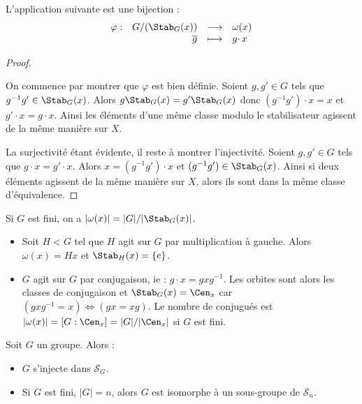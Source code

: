 \begin{prop}

 L'application suivante est une bijection :
\begin{displaymath}  \begin{array}{rrcl}
             \varphi :& G/(\Stab_G(x)) &\longrightarrow& \omega (x) \\
           &   \overline{g}   &\longmapsto    &g\cdotp x
             \end{array} \end{displaymath}
\end{prop}

\begin{proof}\ 

 On commence par montrer que $\varphi$ est bien définie.
Soient $g,g' \in G$ tels que $g^{-1}g' \in \Stab_G (x)$. Alors $g\Stab_G(x) =
g'\Stab_G(x)$ donc $(g^{-1}g')\cdotp x = x $ et $ g' \cdotp x = g
\cdotp x$. Ainsi les éléments d'une même classe modulo le stabilisateur
agissent de la même manière sur $X$.

La surjectivité étant évidente, il reste à montrer l'injectivité. Soient $g,g'
\in G$ tels que $g\cdotp x = g' \cdotp x$. Alors $x = (g^{-1}g')\cdotp x$ et
$(g^{-1}g') \in \Stab_G(x)$. Ainsi si deux éléments agissent de la même manière
sur $X$, alors ils sont dans la même classe d'équivalence.
\end{proof}

\begin{example}[Remarque]
 Si $G$ est fini, on a $|\omega(x)| = |G| / |\Stab_G(x)|$.
\end{example}

\begin{example}[Exemples]
\begin{itemize}
\item Soit $H < G$ tel que $H$ agit sur $G$ par multiplication à gauche. Alors
$\omega (x) = Hx$ et $\Stab_H(x) = \{e\}$.
 
\item $G$ agit sur $G$ par conjugaison, ie : $g\cdotp x = gxg^{-1}$. Les orbites
sont alors les classes de conjugaison et $\Stab_G(x) = \Cen_x$ car $(gxg^{-1} =
x) \Leftrightarrow (gx = xg)$. Le nombre de conjugués est $|\omega(x)| =
[G:\Cen_x] = |G| / |\Cen_x|$ si $G$ est fini.
\end{itemize} \end{example}

\begin{theo}[Cayley - 1878]

 Soit $G$ un groupe. Alors :
\begin{itemize}
 \item $G$ s'injecte dans $\mathcal{S}_G$.
 \item Si $G$ est fini, $|G| = n$, alors $G$ est isomorphe à un sous-groupe de
$\mathcal{S}_n$.
\end{itemize}
\end{theo}

